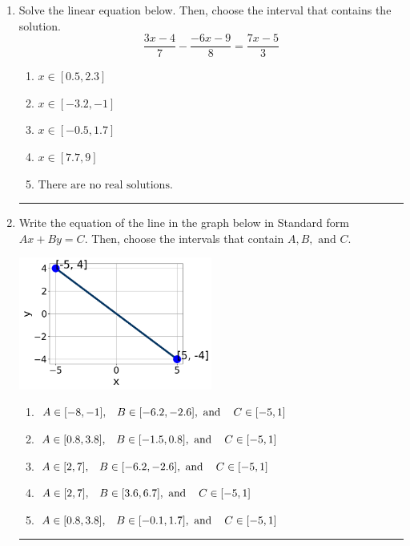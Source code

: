 \documentclass[14pt]{extbook}
\newcommand{\litem}[1]{\item#1\hspace*{-1cm}\rule{\textwidth}{0.4pt}}
\begin{document}
\begin{enumerate}
{\begin{enumerate}[label=\Alph*.]
\end{enumerate} }
\litem{
Solve the linear equation below. Then, choose the interval that contains the solution.\[ \frac{3x -4}{7} - \frac{-6x -9}{8} = \frac{7x -5}{3} \]\begin{enumerate}[label=\Alph*.]
\item \( x \in [0.5, 2.3] \)
\item \( x \in [-3.2, -1] \)
\item \( x \in [-0.5, 1.7] \)
\item \( x \in [7.7, 9] \)
\item \( \text{There are no real solutions.} \)

\end{enumerate} }
\litem{
Write the equation of the line in the graph below in Standard form $Ax+By=C$. Then, choose the intervals that contain $A, B, \text{ and } C$.
\begin{center}
    \includegraphics[width=0.5\textwidth]{../Figures/linearGraphToStandardB.png}
\end{center}
\begin{enumerate}[label=\Alph*.]
\item \( A \in [-8, -1], \hspace{3mm} B \in [-6.2, -2.6], \text{ and } \hspace{3mm} C \in [-5, 1] \)
\item \( A \in [0.8, 3.8], \hspace{3mm} B \in [-1.5, 0.8], \text{ and } \hspace{3mm} C \in [-5, 1] \)
\item \( A \in [2, 7], \hspace{3mm} B \in [-6.2, -2.6], \text{ and } \hspace{3mm} C \in [-5, 1] \)
\item \( A \in [2, 7], \hspace{3mm} B \in [3.6, 6.7], \text{ and } \hspace{3mm} C \in [-5, 1] \)
\item \( A \in [0.8, 3.8], \hspace{3mm} B \in [-0.1, 1.7], \text{ and } \hspace{3mm} C \in [-5, 1] \)


\end{enumerate}}
\end{enumerate}
\end{document}
